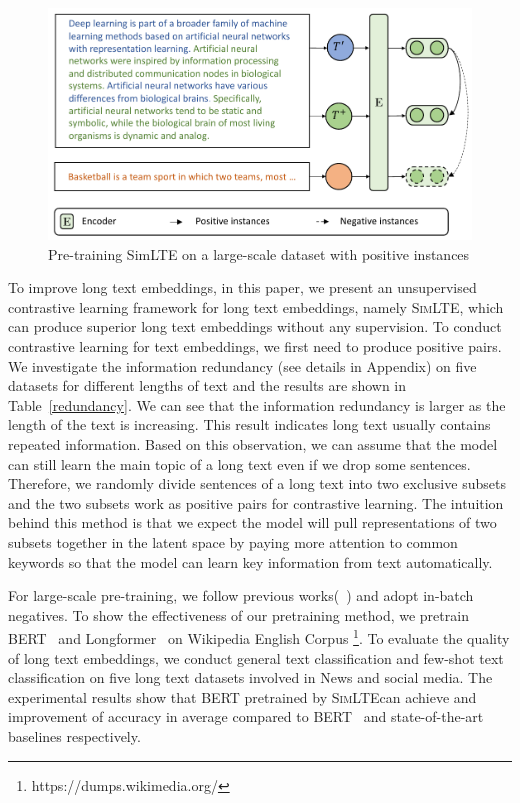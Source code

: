 \documentclass[11pt]{article}
\newcommand{\todo}[1]{{\color{red}{#1}}}
\newcommand{\our}{\mbox{\textsc{SimLTE}}}
\begin{document}
\begin{figure}
\includegraphics[width=\columnwidth]{fig/simlte.pdf}
\caption{Pre-training SimLTE on a  large-scale dataset with positive instances
}  
\label{overall}
\end{figure}

To improve long text embeddings, in this paper, we present an unsupervised contrastive learning framework for long text embeddings, namely \our, which can produce superior long text embeddings without any supervision.
To conduct contrastive learning for text embeddings, we first need to produce positive pairs.
We investigate the information redundancy (see details in Appendix) on five datasets for different lengths of text and the results are shown in Table~\ref{redundancy}.
We can see that the information redundancy is larger as the length of the text is increasing. 
This result indicates long text usually contains repeated information. 
Based on this observation, we can assume that the model can still learn the main topic of a long text even if we drop some sentences. 
Therefore, we randomly divide sentences of a long text into two exclusive subsets and the two subsets work as positive pairs for contrastive learning. 
The intuition behind this method is that we expect the model will pull representations of two subsets together in the latent space by paying more attention to common keywords so that the model can learn key information from text automatically. 

For large-scale pre-training, we follow previous works(~\cite{Gao2021SimCSESC, Li2022UCTopicUC}) and adopt in-batch negatives. 
To show the effectiveness of our pretraining method, we pretrain BERT~\cite{Devlin2019BERTPO} and Longformer~\cite{Beltagy2020LongformerTL} on Wikipedia English Corpus \footnote{https://dumps.wikimedia.org/}.
To evaluate the quality of long text embeddings, we conduct general text classification and few-shot text classification on five long text datasets involved in News and social media. 
The experimental results show that BERT pretrained by \our can achieve \todo{NUM} and \todo{NUM} improvement of accuracy in average compared to BERT~\cite{Devlin2019BERTPO} and state-of-the-art baselines respectively.
\end{document}
